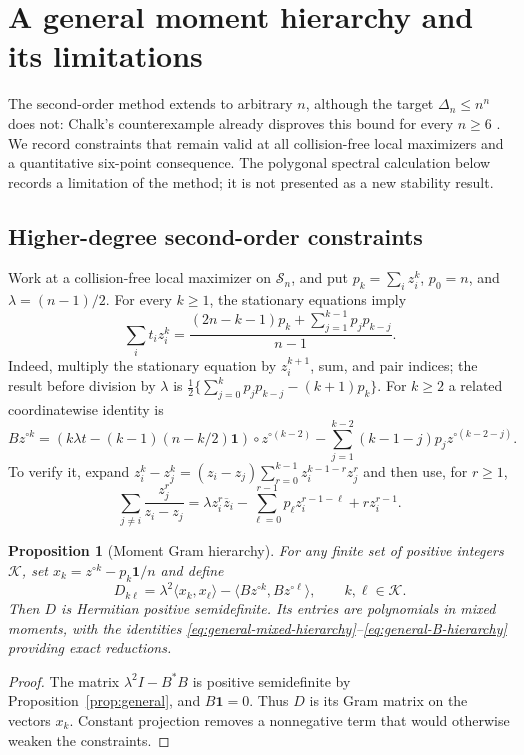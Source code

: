 \documentclass[11pt]{article}
\newtheorem{proposition}[theorem]{Proposition}
\theoremstyle{remark}
\newcommand{\one}{\mathbf 1}
\newcommand{\ip}[2]{\langle#1,#2\rangle}
\numberwithin{equation}{section}
\begin{document}
\section{A general moment hierarchy and its limitations}
\label{sec:extensions}
The second-order method extends to arbitrary $n$, although the target
$\Delta_n\le n^n$ does not: Chalk's counterexample already disproves this
bound for every $n\ge6$ \cite{Chalk}. We record constraints that remain
valid at all collision-free local maximizers and a quantitative six-point
consequence. The polygonal spectral calculation below records a
limitation of the method; it is not presented as a new stability result.

\subsection{Higher-degree second-order constraints}
Work at a collision-free local maximizer on $\mathcal S_n$, and put
$p_k=\sum_i z_i^k$, $p_0=n$, and $\lambda=(n-1)/2$.
For every $k\ge1$, the stationary equations imply
\begin{equation}\label{eq:general-mixed-hierarchy}
 \sum_i t_i z_i^k=
 \frac{(2n-k-1)p_k+\sum_{j=1}^{k-1}p_jp_{k-j}}{n-1}.
\end{equation}
Indeed, multiply the stationary equation by $z_i^{k+1}$, sum, and pair
indices; the result before division by $\lambda$ is
$\frac12\{\sum_{j=0}^k p_jp_{k-j}-(k+1)p_k\}$.
For $k\ge2$ a related coordinatewise identity is
\begin{equation}\label{eq:general-B-hierarchy}
 Bz^{\circ k}=
 \left(k\lambda t-(k-1)(n-k/2)\one\right)\circ z^{\circ(k-2)}
 -\sum_{j=1}^{k-2}(k-1-j)p_jz^{\circ(k-2-j)}.
\end{equation}
To verify it, expand
$z_i^k-z_j^k=(z_i-z_j)\sum_{r=0}^{k-1}z_i^{k-1-r}z_j^r$
and then use, for $r\ge1$,
\[
 \sum_{j\ne i}\frac{z_j^r}{z_i-z_j}
 =\lambda z_i^r\overline z_i
 -\sum_{\ell=0}^{r-1}p_\ell z_i^{r-1-\ell}+r z_i^{r-1}.
\]

\begin{proposition}[Moment Gram hierarchy]\label{prop:moment-hierarchy}
For any finite set of positive integers $\mathcal K$, set
$x_k=z^{\circ k}-p_k\one/n$ and define
\begin{equation}\label{eq:general-D-hierarchy}
 D_{k\ell}=\lambda^2\ip{x_k}{x_\ell}
       -\ip{Bz^{\circ k}}{Bz^{\circ\ell}},\qquad k,\ell\in\mathcal K.
\end{equation}
Then $D$ is Hermitian positive semidefinite. Its entries are polynomials
in mixed moments, with the identities
\eqref{eq:general-mixed-hierarchy}--\eqref{eq:general-B-hierarchy}
providing exact reductions.
\end{proposition}
\begin{proof}
The matrix $\lambda^2I-B^*B$ is positive semidefinite by
Proposition~\ref{prop:general}, and $B\one=0$. Thus $D$ is its Gram
matrix on the vectors $x_k$. Constant projection removes a nonnegative
term that would otherwise weaken the constraints.
\end{proof}
\end{document}
